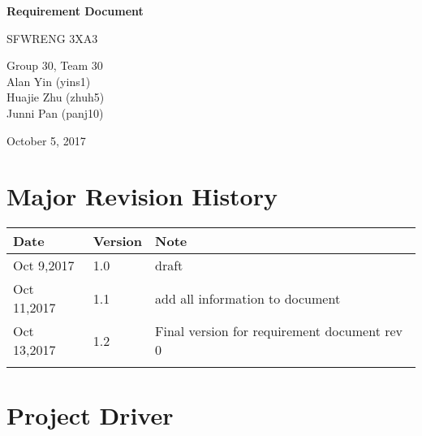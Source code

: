 \documentclass[12pt]{article}
\begin{document}
\begin{titlepage}
    \begin{center}
        \vspace*{1cm}
        
        \Huge
        \textbf{Requirement Document}
        
        \vspace{0.5cm}
        \LARGE
        SFWRENG 3XA3
        
        \vspace{1.5cm}
        
        \Large
        Group 30, Team 30
		\\ Alan Yin (yins1)
		\\ Huajie Zhu (zhuh5)
		\\ Junni Pan (panj10)
        
        \vspace{1.5cm}
        
        \Large
        October 5, 2017
        
    \end{center}
\end{titlepage}

\newpage
\tableofcontents
\listoftables
\listoffigures


\newpage
\color{red}
{\section{Major Revision History}
\begin{table}[h!]
\centering
\begin{tabular}{ | m{10em} | m{1.5cm}| m{5cm}|} 
\hline
Date & Version & Note \\ 
\hline
Oct 9,2017 & 1.0 & draft \\ 
\hline
Oct 11,2017 & 1.1 & add all information to document \\ 
\hline
Oct 13,2017 & 1.2 & Final version for requirement document rev 0 \\ 
\hline
\color{red}{Dec 6,2017} & \color{red}{1.3} & \color{red}{Final version for requirement document rev 1} \\ 
\hline
\end{tabular}
\end{table}
}\color{black}




\section{Project Driver}
\end{document}
